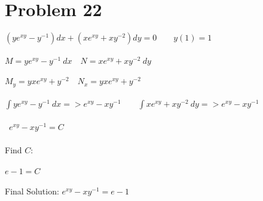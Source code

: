 \documentclass[12pt]{exam}
\begin{document}
\section*{Problem 22}
$(ye^{xy}-y^{-1})dx+(xe^{xy}+xy^{-2})dy=0\qquad y(1)=1$\\\\
$M=ye^{xy}-y^{-1}\:dx\quad N=xe^{xy}+xy^{-2}\:dy$\\\\
$M_y=yxe^{xy}+y^{-2}\quad N_x=yxe^{xy}+y^{-2}$\\\\
$\int ye^{xy}-y^{-1}\:dx=>e^{xy}-xy^{-1}\qquad\int xe^{xy}+xy^{-2}\:dy=>e^{xy}-xy^{-1}$\\\\\
$e^{xy}-xy^{-1}=C$\\\\
Find $C$:\\\\
$e-1=C$\\\\
Final Solution: $e^{xy}-xy^{-1}=e-1$
\end{document}
